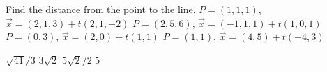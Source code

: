
\begin{Exercise}[
name={},
title={}, 
difficulty=0,
origin={\cite{GHC}}]
Find the distance from the point to the line.
\Question $P=(1,1,1)$, \quad $\vec x = (2,1,3) + t(2,1,-2)$
\Question $P=(2,5,6)$, \quad  $\vec x = (-1,1,1) + t(1,0,1)$
\Question $P=(0,3)$, \quad  $\vec x = (2,0) + t(1,1)$
\Question $P=(1,1)$,  \quad $\vec x = (4,5) + t(-4,3)$
\end{Exercise}

\begin{Answer}
\Question $\sqrt{41}/3$
\Question $3\sqrt{2}$
\Question $5\sqrt{2}/2$
\Question $5$
\end{Answer}
